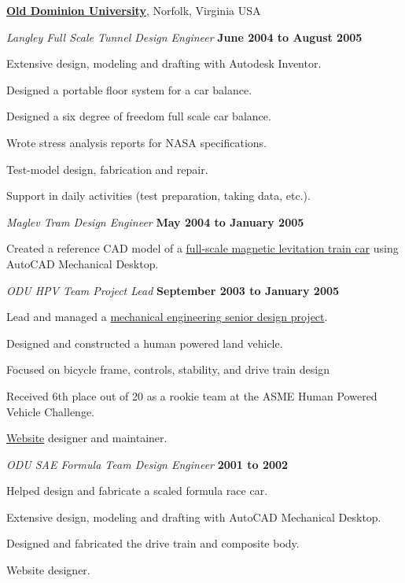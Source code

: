 \documentclass[10pt]{article}
\newenvironment{outerlist}[1][\enskip\textbullet]%
        {\begin{itemize}[#1]}{\end{itemize}%
         \vspace{-.6\baselineskip}}
\newenvironment{innerlist}[1][\enskip\textbullet]%
        {\begin{compactitem}[#1]}{\end{compactitem}}
\newcommand{\blankline}{\quad\pagebreak[2]}
\begin{document}
\blankline

\href{http://www.odu.edu}{\textbf{Old Dominion University}}, Norfolk, Virginia USA
\begin{outerlist}
  \item[] \textit{Langley Full Scale Tunnel Design Engineer}%
    \hfill \textbf{June 2004 to August 2005}
  \begin{innerlist}
    \item Extensive design, modeling and drafting with Autodesk Inventor.
    \item Designed a portable floor system for a car balance.
    \item Designed a six degree of freedom full scale car balance.
    \item Wrote stress analysis reports for NASA specifications.
    \item Test-model design, fabrication and repair.
    \item Support in daily activities (test preparation, taking data, etc.).
  \end{innerlist}

  \item[] \textit{Maglev Tram Design Engineer}%
    \hfill \textbf{May 2004 to January 2005}
  \begin{innerlist}
    \item Created a reference CAD model of a
      \href{http://ww2.eng.odu.edu/maglev/}{full-scale magnetic levitation
      train car} using AutoCAD Mechanical Desktop.
  \end{innerlist}

  \item[] \textit{ODU HPV Team Project Lead}%
    \hfill \textbf{September 2003 to January 2005}
  \begin{innerlist}
    \item Lead and managed a
      \href{http://www.lions.odu.edu/~dlandman/hpv/}{mechanical engineering
      senior design project}.
    \item Designed and constructed a human powered land vehicle.
    \item Focused on bicycle frame, controls, stability, and drive train design
    \item Received 6th place out of 20 as a rookie team at the ASME Human
        Powered Vehicle Challenge.
    \item \href{http://www.lions.odu.edu/~dlandman/hpv/}{Website} designer
      and maintainer.
  \end{innerlist}

  \item[] \textit{ODU SAE Formula Team Design Engineer}%
    \hfill \textbf{2001 to 2002}
  \begin{innerlist}
    \item Helped design and fabricate a scaled formula race car.
    \item Extensive design, modeling and drafting with AutoCAD Mechanical Desktop.
    \item Designed and fabricated the drive train and composite body.
    \item Website designer.
  \end{innerlist}
\end{outerlist}
\end{document}
